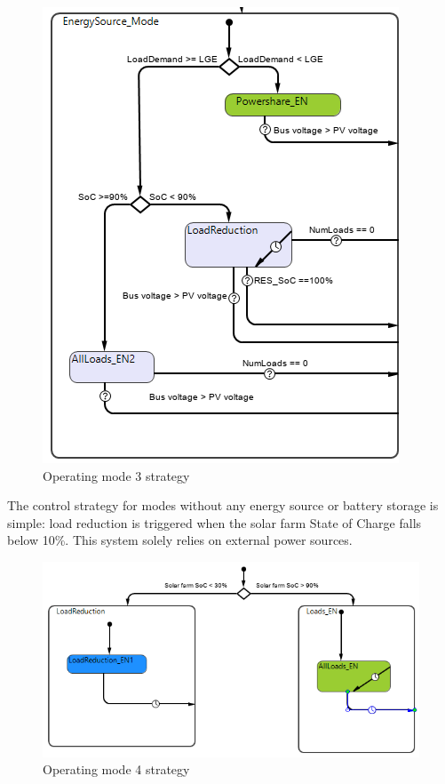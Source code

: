 \begin{figure}[H]
	\centering
	\includegraphics[totalheight=12cm]{Figures/opmod3 strategy.png}
	\caption{Operating mode 3 strategy}
\end{figure}
The control strategy for modes without any energy source or battery storage is simple: load reduction is triggered when the solar farm State of Charge falls below 10\%. This system solely relies on external power sources.\par
\begin{figure}[H]
	\centering
	\includegraphics[totalheight=8cm]{Figures/opmod4 strategy.png}
	\caption{Operating mode 4 strategy}
\end{figure}
